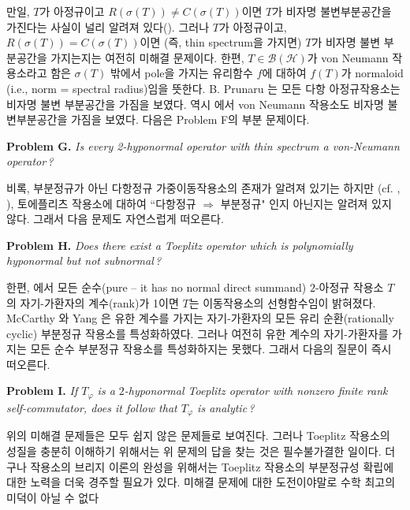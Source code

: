 \documentclass[12pt,a4paper,2sided]{article}
\begin{document}
 만일, $T$가 아정규이고 $R(\sigma(T))\ne
C(\sigma(T))$이면 $T$가 비자명 불변부분공간을 가진다는 사실이 널리
알려져 있다(\cite{Bro}). 그러나 $T$가 아정규이고,
$R(\sigma(T))=C(\sigma(T))$이면 (즉, thin spectrum을 가지면) $T$가
비자명 불변 부분공간을 가지는지는 여전히 미해결 문제이다. 한편,
$T\in\mathcal{B(H)}$가 von Neumann 작용소라고 함은 $\sigma(T)$
밖에서 pole을 가지는 유리함수 $f$에 대하여 $f(T)$가 normaloid (i.e.,
norm = spectral radius)임을 뜻한다. B. Prunaru \cite{Pru}는 모든
다항 아정규작용소는 비자명 불변 부분공간을 가짐을 보였다. 역시
\cite{Ag}에서 von Neumann 작용소도 비자명 불변부분공간을 가짐을
보였다. 다음은 Problem F의 부분 문제이다.

\vspace{.2 cm}


{\bf Problem G.} {\sl Is every 2-hyponormal operator with thin
spectrum a von-Neumann operator\,? }

\vspace{.2 cm}

비록, 부분정규가 아닌 다항정규 가중이동작용소의 존재가 알려져 있기는
하지만 (cf. \cite{CP1}, \cite{CP2}), 토에플리츠 작용소에 대하여
``다항정규 $\Rightarrow$ 부분정규" 인지 아닌지는 알려져 있지 않다.
그래서 다음 문제도 자연스럽게 떠오른다.

\vspace{.2 cm}

{\bf Problem H.} {\sl Does there exist a Toeplitz operator which is
polynomially hyponormal but not subnormal\,? }

\vspace{.2 cm}

한편, \cite{CuL2}에서 모든 순수(pure -- it has no normal direct
summand) $2$-아정규 작용소 $T$의 자기-가환자의 계수(rank)가 1이면
$T$는 이동작용소의 선형함수임이 밝혀졌다. McCarthy 와 Yang
\cite{McCYa}은 유한 계수를 가지는 자기-가환자의 모든 유리
순환(rationally cyclic) 부분정규 작용소를 특성화하였다. 그러나
여전히 유한 계수의 자기-가환자를 가지는 모든 순수 부분정규 작용소를
특성화하지는 못했다. 그래서 다음의 질문이 즉시 떠오른다.

\vspace{.2 cm} {\bf Problem I.} {\sl If $T_\varphi$ is a
$2$-hyponormal Toeplitz operator with nonzero finite rank
self-commutator, does it follow that $T_\varphi$ is analytic\,? }

\vspace{.2 cm}

위의 미해결 문제들은 모두 쉽지 않은 문제들로 보여진다. 그러나
Toeplitz 작용소의 성질을 충분히 이해하기 위해서는 위 문제의 답을
찾는 것은 필수불가결한 일이다. 더구나 작용소의 브리지 이론의 완성을
위해서는 Toeplitz 작용소의 부분정규성 확립에 대한 노력을 더욱 경주할
필요가 있다. 미해결 문제에 대한 도전이야말로 수학 최고의 미덕이 아닐
수 없다
\end{document}
